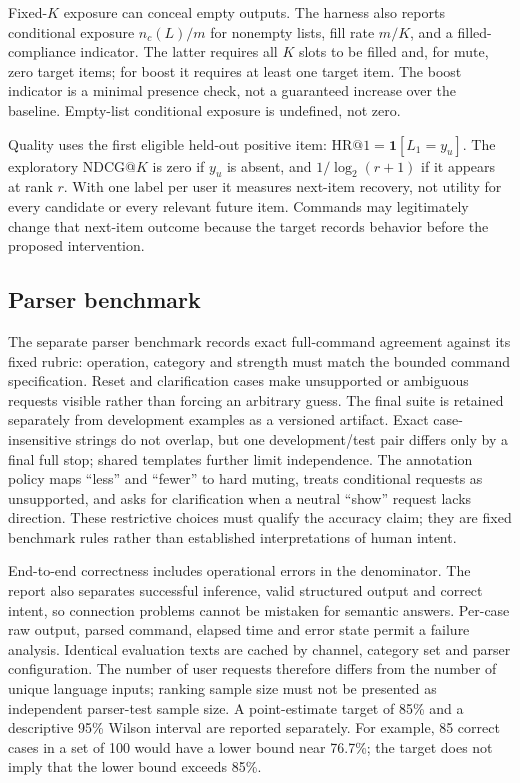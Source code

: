 \documentclass[conference]{IEEEtran}
\begin{document}
Fixed-$K$ exposure can conceal empty outputs. The harness also reports conditional exposure $n_c(L)/m$ for nonempty lists, fill rate $m/K$, and a filled-compliance indicator. The latter requires all $K$ slots to be filled and, for mute, zero target items; for boost it requires at least one target item. The boost indicator is a minimal presence check, not a guaranteed increase over the baseline. Empty-list conditional exposure is undefined, not zero.

Quality uses the first eligible held-out positive item: $\mathrm{HR}@1=\mathbf 1[L_1=y_u]$. The exploratory NDCG@$K$ is zero if $y_u$ is absent, and $1/\log_2(r+1)$ if it appears at rank $r$. With one label per user it measures next-item recovery, not utility for every candidate or every relevant future item. Commands may legitimately change that next-item outcome because the target records behavior before the proposed intervention.

\subsection{Parser benchmark}
The separate parser benchmark records exact full-command agreement against its fixed rubric: operation, category and strength must match the bounded command specification. Reset and clarification cases make unsupported or ambiguous requests visible rather than forcing an arbitrary guess. The final suite is retained separately from development examples as a versioned artifact. Exact case-insensitive strings do not overlap, but one development/test pair differs only by a final full stop; shared templates further limit independence. The annotation policy maps ``less'' and ``fewer'' to hard muting, treats conditional requests as unsupported, and asks for clarification when a neutral ``show'' request lacks direction. These restrictive choices must qualify the accuracy claim; they are fixed benchmark rules rather than established interpretations of human intent.

End-to-end correctness includes operational errors in the denominator. The report also separates successful inference, valid structured output and correct intent, so connection problems cannot be mistaken for semantic answers. Per-case raw output, parsed command, elapsed time and error state permit a failure analysis. Identical evaluation texts are cached by channel, category set and parser configuration. The number of user requests therefore differs from the number of unique language inputs; ranking sample size must not be presented as independent parser-test sample size. A point-estimate target of 85\% and a descriptive 95\% Wilson interval are reported separately. For example, 85 correct cases in a set of 100 would have a lower bound near 76.7\%; the target does not imply that the lower bound exceeds 85\%.
\end{document}
